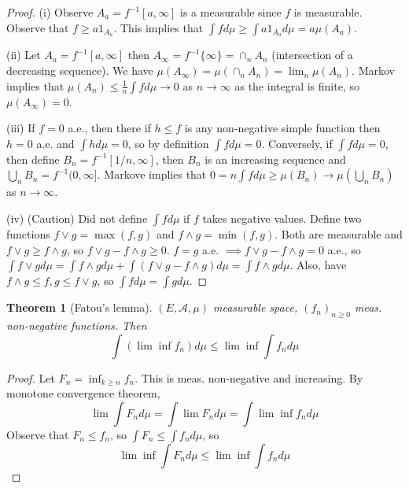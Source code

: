 \documentclass{article}
\theoremstyle{definition}
\theoremstyle{remark}
\theoremstyle{plain}
\newtheorem{thm}[defn]{Theorem}
\begin{document}
\begin{proof}
    (i) Observe $A_a=f^{-1}[a,\infty]$ is a measurable since $f$ is measurable. Observe that $f\ge a1_{A_a}$. This implies that $\int fd\mu\ge \int a1_{A_a}d\mu=a\mu(A_a)$.

    (ii) Let $A_a=f^{-1}[a,\infty]$ then $A_\infty=f^{-1}\{\infty\}=\cap_nA_n$ (intersection of a decreasing sequence). We have $\mu(A_\infty)=\mu(\cap_nA_n)=\lim_n\mu(A_n)$. Markov implies that $\mu(A_n)\le \frac{1}{n}\int fd\mu\to 0$ as $n\to\infty$ as the integral is finite, so $\mu(A_\infty)=0$.

    (iii) If $f=0$ a.e., then there if $h\le f$ is any non-negative simple function then $h=0$ a.e. and $\int hd\mu=0$, so by definition $\int fd\mu=0$. Conversely, if $\int fd\mu=0$, then define $B_n=f^{-1}[1/n,\infty]$, then $B_n$ is an increasing sequence and $\bigcup_nB_n=f^{-1}(0,\infty]$. Markove implies that $0=n\int fd\mu\ge \mu(B_n)\to \mu(\bigcup_nB_n)$ as $n\to\infty$. 

    (iv) (Caution) Did not define $\int fd\mu$ if $f$ takes negative values. Define two functions $f\vee g=\max(f,g)$ and $f\wedge g=\min(f,g)$. Both are measurable and $f\vee g\ge f\wedge g$, so $f\vee g-f\wedge g\ge 0$. $f=g$ a.e. $\implies f\vee g-f\wedge g=0$ a.e., so $\int f\vee gd\mu=\int f\wedge gd\mu+\int(f\vee g-f\wedge g)d\mu=\int f\wedge gd\mu$. Also, have $f\wedge g\le f,g\le f\vee g$, so $\int fd\mu=\int gd\mu$.
\end{proof}
\begin{thm}[Fatou's lemma]
    $(E,\mathcal{A},\mu)$ measurable space, $(f_n)_{n\ge0}$ meas. non-negative functions. Then
    \[\int(\lim\inf f_n)d\mu\le\lim\inf\int f_nd\mu\]
\end{thm}
\begin{proof}
    Let $F_n=\inf_{k\ge n}f_n$. This is meas. non-negative and increasing. By monotone convergence theorem,
    \[\lim \int F_nd\mu=\int\lim F_nd\mu=\int\lim\inf f_nd\mu\]
    Observe that $F_n\le f_n$, so $\int F_n\le\int f_nd\mu$, so
    \[\lim\inf\int F_nd\mu\le\lim\inf\int f_nd\mu\]
\end{proof}
\end{document}
